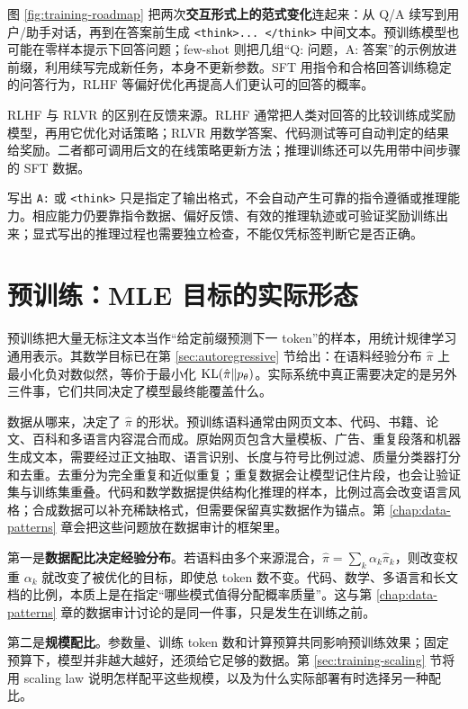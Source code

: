 图 \ref{fig:training-roadmap} 把两次\textbf{交互形式上的范式变化}连起来：从 Q/A 续写到用户/助手对话，再到在答案前生成 \texttt{<think>... </think>} 中间文本。预训练模型也可能在零样本提示下回答问题；few-shot 则把几组“Q: 问题，A: 答案”的示例放进前缀，利用续写完成新任务，本身不更新参数。SFT 用指令和合格回答训练稳定的问答行为，RLHF 等偏好优化再提高人们更认可的回答的概率。

RLHF 与 RLVR 的区别在反馈来源。RLHF 通常把人类对回答的比较训练成奖励模型，再用它优化对话策略；RLVR 用数学答案、代码测试等可自动判定的结果给奖励。二者都可调用后文的在线策略更新方法；推理训练还可以先用带中间步骤的 SFT 数据。

写出 \texttt{A:} 或 \texttt{<think>} 只是指定了输出格式，不会自动产生可靠的指令遵循或推理能力。相应能力仍要靠指令数据、偏好反馈、有效的推理轨迹或可验证奖励训练出来；显式写出的推理过程也需要独立检查，不能仅凭标签判断它是否正确。

\section{预训练：MLE 目标的实际形态}

预训练把大量无标注文本当作“给定前缀预测下一 token”的样本，用统计规律学习通用表示。其数学目标已在第 \ref{sec:autoregressive} 节给出：在语料经验分布 \(\hat\pi\) 上最小化负对数似然，等价于最小化 \(\mathrm{KL}(\hat\pi\Vert p_\theta)\)。实际系统中真正需要决定的是另外三件事，它们共同决定了模型最终能覆盖什么。

数据从哪来，决定了 \(\hat\pi\) 的形状。预训练语料通常由网页文本、代码、书籍、论文、百科和多语言内容混合而成。原始网页包含大量模板、广告、重复段落和机器生成文本，需要经过正文抽取、语言识别、长度与符号比例过滤、质量分类器打分和去重。去重分为完全重复和近似重复；重复数据会让模型记住片段，也会让验证集与训练集重叠。代码和数学数据提供结构化推理的样本，比例过高会改变语言风格；合成数据可以补充稀缺格式，但需要保留真实数据作为锚点。第 \ref{chap:data-patterns} 章会把这些问题放在数据审计的框架里。

第一是\textbf{数据配比决定经验分布}。若语料由多个来源混合，\(\hat\pi=\sum_k\alpha_k\hat\pi_k\)，则改变权重 \(\alpha_k\) 就改变了被优化的目标，即使总 token 数不变。代码、数学、多语言和长文档的比例，本质上是在指定“哪些模式值得分配概率质量”。这与第 \ref{chap:data-patterns} 章的数据审计讨论的是同一件事，只是发生在训练之前。

第二是\textbf{规模配比}。参数量、训练 token 数和计算预算共同影响预训练效果；固定预算下，模型并非越大越好，还须给它足够的数据。第 \ref{sec:training-scaling} 节将用 scaling law 说明怎样配平这些规模，以及为什么实际部署有时选择另一种配比。

